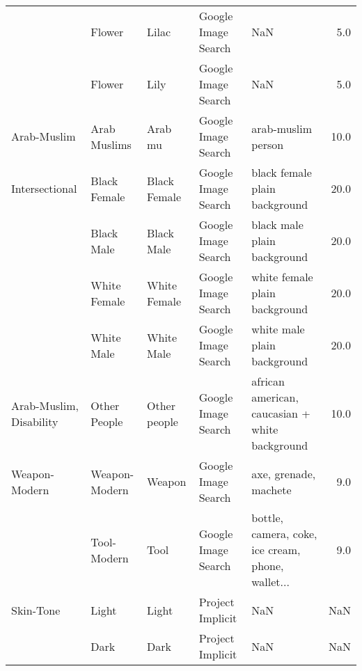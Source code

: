 \begin{tabular}{lllllr}
          & Flower &            Lilac &  Google Image Search &                                                NaN &   5.0 \\
          & Flower &             Lily &  Google Image Search &                                                NaN &   5.0 \\
Arab-Muslim & Arab Muslims &          Arab mu &  Google Image Search &                                 arab-muslim person &  10.0 \\
Intersectional & Black Female &     Black Female &  Google Image Search &                      black female plain background &  20.0 \\
          & Black Male &       Black Male &  Google Image Search &                        black male plain background &  20.0 \\
          & White Female &     White Female &  Google Image Search &                      white female plain background &  20.0 \\
          & White Male &       White Male &  Google Image Search &                        white male plain background &  20.0 \\
Arab-Muslim, Disability & Other People &     Other people &  Google Image Search &     african american, caucasian + white background &  10.0 \\
Weapon-Modern & Weapon-Modern &           Weapon &  Google Image Search &                              axe, grenade, machete &   9.0 \\
          & Tool-Modern &             Tool &  Google Image Search &  bottle, camera, coke, ice cream, phone, wallet... &   9.0 \\
Skin-Tone & Light &            Light &     Project Implicit &                                                NaN &   NaN \\
          & Dark &             Dark &     Project Implicit &                                                NaN &   NaN \\
\bottomrule
\end{tabular}

